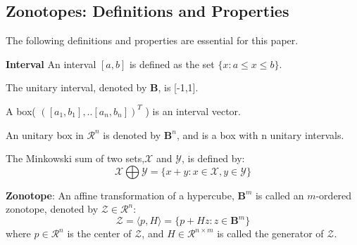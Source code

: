 \subsection{Zonotopes: Definitions and Properties}
The following definitions and properties are essential for this paper.
\begin{definition}\textbf{Interval} An interval $[a,b]$ is defined as the set $\{x : a \leq x \leq b\}$.
\begin{subdefinition}
The unitary interval, denoted by $\textbf{B}$, is [-1,1].
\end{subdefinition}
\begin{subdefinition}
A box( $( [a_1, b_1],..[a_n, b_n] )^T$ ) is an interval vector.
\end{subdefinition}
\begin{subdefinition}
An unitary box in $\mathcal{R}^n$ is denoted by $\textbf{B}^n$, and is a box with n unitary intervals.
\end{subdefinition}
\end{definition}
\begin{definition}
The Minkowski sum of two sets,$\mathcal{X}$ and $\mathcal{Y}$, is defined by: 
\begin{equation}
\mathcal{X} \bigoplus \mathcal{Y} = \{x+ y: x \in \mathcal{X}, y \in \mathcal{Y}\}
\end{equation}
\end{definition}
\begin{definition}
\textbf{Zonotope}:
An affine transformation of a hypercube, $\textbf{B}^m$ is called an $m$-ordered zonotope, denoted by $\mathcal{Z}\in \mathcal{R}^n$:\\
\begin{equation}
\mathcal{Z} = \langle p, H \rangle = \{p+ Hz: z \in \textbf{B}^m\}
\end{equation}
where $p \in \mathcal{R}^n$ is the center of $\mathcal{Z}$, and $H \in \mathcal{R}^{n \times m}$ is called the generator of $\mathcal{Z}$.
\end{definition}

